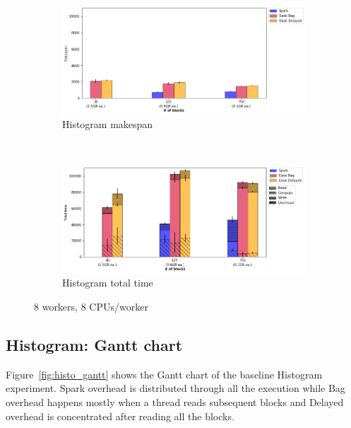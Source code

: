 \documentclass[conference]{IEEEtran}
\newcommand{\TG}[1]{\color{cyan}From Tristan: #1 \color{black}}
\begin{document}
\begin{figure}[!t]
    \centering
    \begin{subfigure}[b]{\columnwidth}
        \includegraphics[clip,width=\columnwidth]{images/histo_block.png}%
        \caption{Histogram makespan}\label{fig:histo_ms_block}
    \end{subfigure}
    \\
    \begin{subfigure}[b]{\columnwidth}
        \includegraphics[clip,width=\columnwidth]{images/histo_idle_block.png}%
        \caption{Histogram total time}\label{fig:histo_tt_block}
    \end{subfigure}
    \caption{8 workers, 8 CPUs/worker}
\end{figure}

\subsection{Histogram: Gantt chart}
Figure~\ref{fig:histo_gantt} shows the Gantt chart of the baseline Histogram
experiment. Spark overhead is distributed through all the execution while Bag
overhead happens mostly when a thread reads subsequent blocks and
Delayed overhead is concentrated after reading all the blocks.
\end{document}
